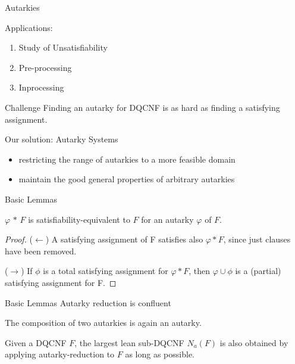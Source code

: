 \documentclass[xcolor=table	]{beamer}
\begin{document}
\begin{frame}{Autarkies}

Applications: 
\begin{enumerate}
    \item Study of Unsatisfiability
    \item Pre-processing 
    \item Inprocessing
\end{enumerate}

 \begin{exampleblock}{Challenge}
 Finding an autarky for DQCNF is as hard as finding a satisfying assignment.
\end{exampleblock}
    
  \begin{alertblock}{Our solution: Autarky Systems}
  \begin{itemize}
      \item restricting the range of autarkies to a more feasible domain
      \item maintain the good general properties of arbitrary autarkies
  \end{itemize}
 
  \end{alertblock}

\end{frame}

\begin{frame}{Basic Lemmas}
 \begin{lemma}[1]
   $\varphi$ $\ast$ $F$ is satisfiability-equivalent to $F$ for an autarky $\varphi$ of $F$.
 \end{lemma}
 \begin{proof}
 	($\leftarrow$) A satisfying assignment of F satisfies also
 	$\varphi \ast F$, since just clauses have been removed. 
 	
 	 ($\to$) If $\phi$ is a total satisfying assignment for $\varphi \ast F$, then $\varphi \cup \phi$ is a (partial) satisfying assignment for F.
 \end{proof}
\end{frame}

\begin{frame}{Basic Lemmas}
 Autarky reduction is confluent  

  \begin{lemma}[2]
  The composition of two autarkies is again an autarky.
 \end{lemma}
 
  \begin{lemma}[3]
   Given a DQCNF $F$, the largest lean sub-DQCNF $N_{a} (F)$ is also \newline obtained by applying autarky-reduction to $F$ as long as possible.
 \end{lemma}
\vspace{0.5cm}
 
\end{frame}
\end{document}
